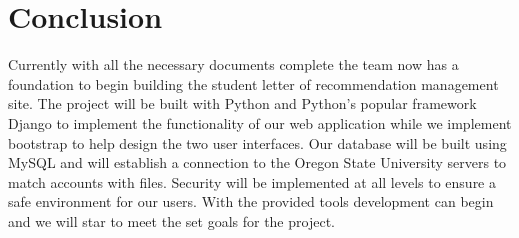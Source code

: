 \documentclass[compsoc, draftclsnofoot, onecolumn, letterpaper, 10pt]{IEEEtran}
\begin{document}
\section{Conclusion}
Currently with all the necessary documents complete the team now has a foundation to begin building the student letter of recommendation management site. The project will be built with Python and Python's popular framework Django to implement the functionality of our web application while we implement bootstrap to help design the two user interfaces. Our database will be built using MySQL and will establish a connection to the Oregon State University servers to match accounts with files. Security will be implemented at all levels to ensure a safe environment for our users. With the provided tools development can begin and we will star to meet the set goals for the project.
\end{document}
